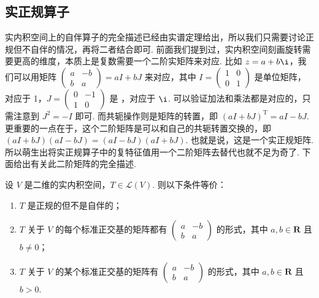 
\subsection{实正规算子}

实内积空间上的自伴算子的完全描述已经由实谱定理给出，所以我们只需要讨论正规但不自伴的情况，再将二者结合即可. 前面我们提到过，实内积空间刻画旋转需要更高的维度，本质上是复数需要一个二阶实矩阵来对应. 比如 $ z = a + b\i $，我们可以用矩阵 $ \begin{pmatrix} a & -b \\ b & a \end{pmatrix} = aI + bJ $ 来对应，其中 $ I = \begin{pmatrix} 1 & 0 \\ 0 & 1 \end{pmatrix} $ 是单位矩阵，对应于 1，$ J = \begin{pmatrix} 0 & -1 \\ 1 & 0 \end{pmatrix} $ 是 ，对应于 $ \i $. 可以验证加法和乘法都是对应的，只需注意到 $ J^2 = -I $ 即可. 而共轭操作则是矩阵的转置，即 $ (aI + bJ)^{\mathrm{T}} = aI - bJ $. 更重要的一点在于，这个二阶矩阵是可以和自己的共轭转置交换的，即 $ (aI + bJ)(aI - bJ) = (aI - bJ)(aI + bJ) $. 也就是说，这是一个实正规矩阵. 所以萌生出将实正规算子中的复特征值用一个二阶矩阵去替代也就不足为奇了. 下面给出有关此二阶矩阵的完全描述.

\begin{theorem}{}{}
    设 $ V $ 是二维的实内积空间，$ T \in \mathcal{L}(V) $. 则以下条件等价：
    \begin{enumerate}
        \item $ T $ 是正规的但不是自伴的；

        \item $ T $ 关于 $ V $ 的每个标准正交基的矩阵都有 $ \begin{pmatrix} a & -b \\ b & a \end{pmatrix} $ 的形式，其中 $ a, b \in \mathbf{R} $ 且 $ b \neq 0 $；

        \item $ T $ 关于 $ V $ 的某个标准正交基的矩阵有 $ \begin{pmatrix} a & -b \\ b & a \end{pmatrix} $ 的形式，其中 $ a, b \in \mathbf{R} $ 且 $ b > 0 $.
    \end{enumerate}
\end{theorem}

